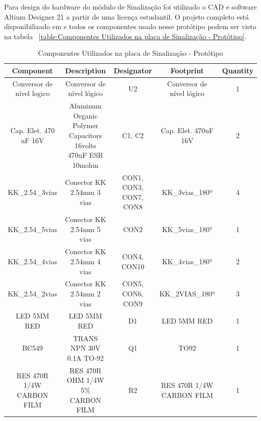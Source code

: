 \documentclass[../poliXuniversity_hospital_-USP-report.tex]{subfiles}
\begin{document}
Para design do hardware do módulo de Sinalização foi utilizado o CAD e software Altium Designer 21 \cite{altium21} a partir de uma licença estudantil. O projeto completo está disponibilizado em \cite{github_modulos} e todos os componentes usado nesse protótipo podem ser visto na tabela ~\ref{table:Componentes Utilizados na placa de Sinalização - Protótipo}.

\begin{table}[!h]
\caption{Componentes Utilizados na placa de Sinalização - Protótipo}
\centering
\begin{adjustbox}{width=\columnwidth,center}
\begin{tabular}{|c|c|c|c|c|}
\hline
Component                   & Description                                                    & Designator               & Footprint                   & Quantity \\ \hline
Conversor de   nível logico & Conversor de nível   lógico                                    & U2                       & Conversor de nível   lógico & 1        \\ \hline
Cap. Elet. 470   uF 16V     & Aluminum Organic   Polymer Capacitors 16volts 470uF ESR 10mohm & C1, C2                   & Cap. Elet. 470uF 16V        & 2        \\ \hline
KK\_2.54\_3vias             & Conector KK 2.54mm 3   vias                                    & CON1, CON3, CON7,   CON8 & KK\_3vias\_180º             & 4        \\ \hline
KK\_2.54\_5vias             & Conector KK 2.54mm 5   vias                                    & CON2                     & KK\_5vias\_180°             & 1        \\ \hline
KK\_2.54\_4vias             & Conector KK 2.54mm 4   vias                                    & CON4, CON10              & KK\_4vias\_180°             & 2        \\ \hline
KK\_2.54\_2vias             & Conector KK 2.54mm 2   vias                                    & CON5, CON6, CON9         & KK\_2VIAS\_180º             & 3        \\ \hline
LED 5MM RED                 & LED 5MM RED                                                    & D1                       & LED 5MM RED                 & 1        \\ \hline
BC549                       & TRANS NPN 30V 0.1A   TO-92                                     & Q1                       & TO92                        & 1        \\ \hline
RES 470R 1/4W   CARBON FILM & RES 470R OHM 1/4W 5\%   CARBON FILM                            & R2                       & RES 470R 1/4W CARBON   FILM & 1        \\ \hline

\end{tabular}
\end{adjustbox}
\end{table}
\end{document}
